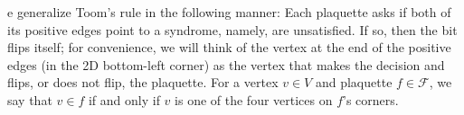 e generalize Toom's rule in the following manner: Each plaquette asks if both of its positive edges point to a syndrome, namely, are unsatisfied. If so, then the bit flips itself; for convenience, we will think of the vertex at the end of the positive edges (in the 2D bottom-left corner) as the vertex that makes the decision and flips, or does not flip, the plaquette. For a vertex $ v \in V $ and plaquette $ f \in \mathcal{F} $, we say that $ v \in f $ if and only if $ v $ is one of the four vertices on $ f $'s corners.

